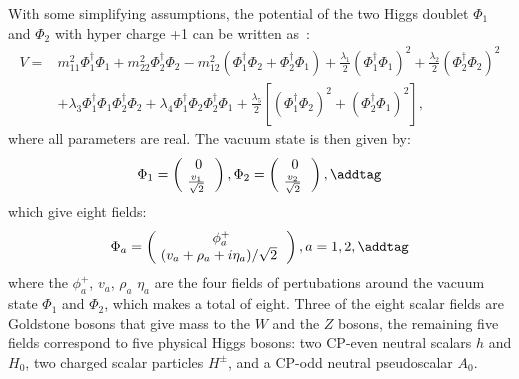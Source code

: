 With some simplifying assumptions, the potential of the two Higgs doublet $\Phi_1$ and
$\Phi_2$ with hyper charge +1 can be written as~\cite{2HDM-Branco}:
\begin{align*}
    V = & m_{11}^2  \Phi_1^\dagger \Phi_1  + m_{22}^2 \Phi_2^\dagger \Phi_2 - m_{12}^2 (\Phi_1^\dagger \Phi_2 + \Phi_2^\dagger \Phi_1) + \frac{\lambda_1}{2}(\Phi_1^\dagger \Phi_1)^2 +\frac{\lambda_2}{2}(\Phi_2^\dagger \Phi_2)^2 \\
    & + \lambda_3 \Phi_1^\dagger \Phi_1 \Phi_2^\dagger \Phi_2 + \lambda_4 \Phi_1^\dagger \Phi_2 \Phi_2^\dagger \Phi_1 +  \frac{\lambda_5}{2}\left[ (\Phi_1^\dagger \Phi_2)^2 + (\Phi_2^\dagger \Phi_1)^2        \right],
\end{align*}
where all parameters are real. 
The vacuum state is then given by:
\[
\Phi_1 =     \begin{pmatrix} 
   0 \\ \ \frac{v_1}{\sqrt{2}} \  \
    \end{pmatrix}, 
\Phi_2 =     \begin{pmatrix} 
    0 \\ \ \frac{v_2}{\sqrt{2}} \  \
        \end{pmatrix}, 
\addtag \]
which give eight fields:
\[
\Phi_a = \begin{pmatrix} 
\phi_a^+ \\ \ (v_a + \rho_a + i \eta_a) /\sqrt{2} \  \
\end{pmatrix}, a = 1,2,    
\addtag \]
where the $\phi_a^+$, $v_a$, $\rho_a$ $\eta_a$ are the four fields
of pertubations around the vacuum state $\Phi_1$ and $\Phi_2$, which makes
a total of eight.  
Three of the eight scalar fields are Goldstone bosons that give mass to the $W$
and the $Z$ bosons, the remaining five fields correspond to five physical Higgs bosons:
two CP-even neutral scalars $h$ and $H_0$, two charged scalar particles $H^\pm$, and a 
CP-odd neutral pseudoscalar $A_0$. 



